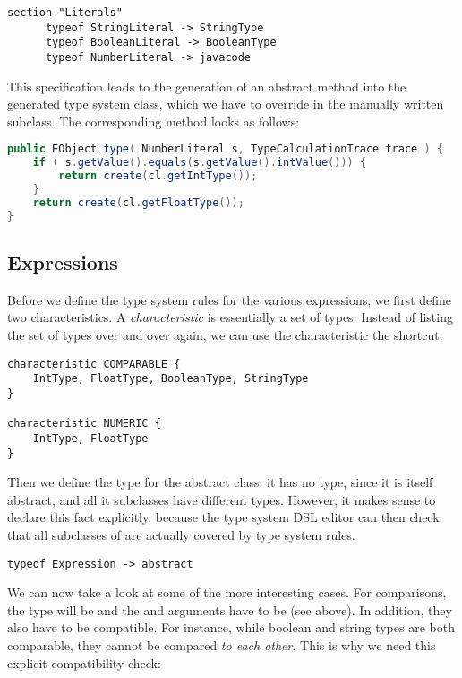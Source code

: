 \begin{lstlisting}[language=xts] 
section "Literals"
      typeof StringLiteral -> StringType
      typeof BooleanLiteral -> BooleanType
      typeof NumberLiteral -> javacode
\end{lstlisting}
 
This specification leads to the generation of an abstract method into the
generated type system class, which we have to override in the manually written
subclass. The corresponding method looks as follows:
 
\begin{lstlisting}[language=Java] 
public EObject type( NumberLiteral s, TypeCalculationTrace trace ) {
    if ( s.getValue().equals(s.getValue().intValue())) {
        return create(cl.getIntType());
    }
    return create(cl.getFloatType());
} 
\end{lstlisting}



\subsection{Expressions}

Before we define the type system rules for the various expressions,  we first
define two characteristics. A \emph{characteristic} is essentially a set of
types. Instead of listing the set of types over and over again, we can use the
characteristic the shortcut.

\begin{lstlisting}[language=xts] 
characteristic COMPARABLE {
    IntType, FloatType, BooleanType, StringType
}  
  
characteristic NUMERIC {
    IntType, FloatType
} 
\end{lstlisting}

Then we define the type for the abstract  class: it 
has no type, since it is itself abstract, and all it subclasses have different
types. However, it makes sense to declare this fact explicitly, because the type
system DSL editor can then check that all subclasses of  are actually
covered by type system rules.

\begin{lstlisting}[language=xts]
typeof Expression -> abstract
\end{lstlisting}

We can now take a look at some of the more interesting cases. For comparisons,
the type will be  and the  and  arguments
have to be  (see above). In addition, they also have to be compatible.
For instance, while boolean and string types are both comparable, they cannot be
compared \emph{to each other}. This is why we need this explicit compatibility check:

